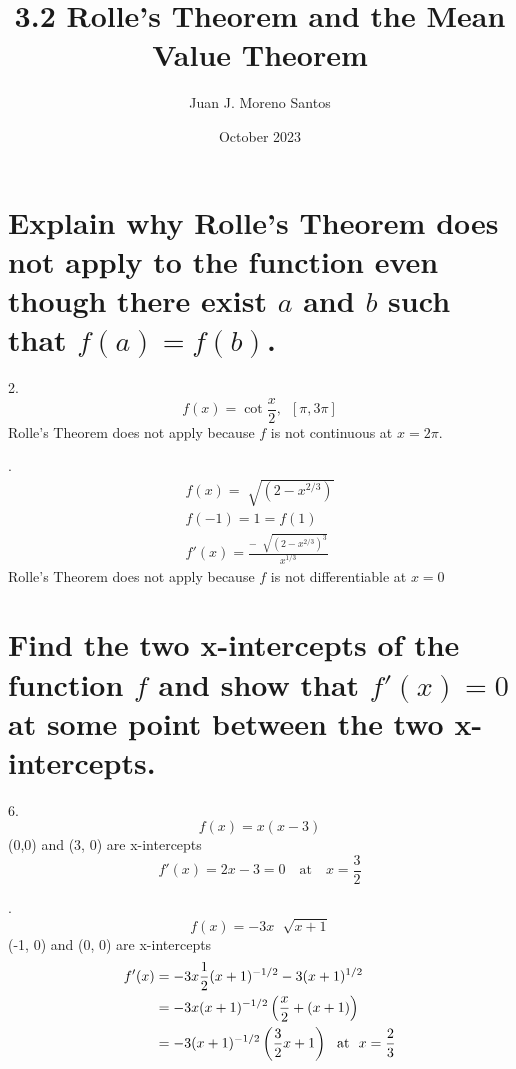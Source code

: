 \documentclass[11pt]{article}
\title{3.2 Rolle's Theorem and the Mean Value Theorem}
\author{Juan J. Moreno Santos}
\date{October 2023}
\newcommand*{\vs}{\vspace{1cm}}
\newcommand*{\next}{\noindent}
\begin{document}
\maketitle

\section{Explain why Rolle's Theorem does not apply to the function even though there exist $a$ and $b$ such that $f(a)=f(b)$.}
2.\[f(x)=\cot\frac{x}{2},\,\,\,[\pi, 3\pi]\]
Rolle's Theorem does not apply because $f$ is not continuous at $x=2\pi$.

\vs
\next
4.\begin{eqnarray}
    f(x)=\sqrt[]{(2-x^{2/3})}\\
    f(-1)=1=f(1)\\
    f'(x)=\frac{-\,\,\sqrt[]{(2-x^{2/3})^3}}{x^{1/3}}
\end{eqnarray}
Rolle's Theorem does not apply because $f$ is not differentiable at $x=0$

\section{Find the two x-intercepts of the function $f$ and show that $f'(x)=0$ at some point between the two x-intercepts.}
6.\[f(x)=x(x-3)\]
(0,0) and (3, 0) are x-intercepts
\[f'(x)=2x-3=0\,\,\,\,\,\,\text{at}\,\,\,\,\,\,x=\frac{3}{2}\]

\vspace{1cm}
.\[f(x)=-3x\,\,\sqrt[]{x+1}\]
(-1, 0) and (0, 0) are x-intercepts
\begin{eqnarray}
    \setcounter{equation}{1}
    f'(x)&=-3x\frac{1}{2}(x+1)^{-1/2}-3(x+1)^{1/2}\\
    &=-3x(x+1)^{-1/2}\left(\frac{x}{2}+(x+1)\right)\\
    &=-3(x+1)^{-1/2}\left(\frac{3}{2}x+1\right)\,\,\,\,\text{at}\,\,\,\, x=\frac{2}{3}
\end{eqnarray}
\end{document}
